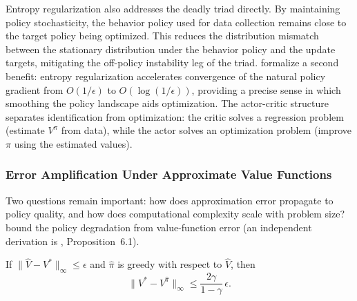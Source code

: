 Entropy regularization also addresses the deadly triad directly. By maintaining policy stochasticity, the behavior policy used for data collection remains close to the target policy being optimized. This reduces the distribution mismatch between the stationary distribution under the behavior policy and the update targets, mitigating the off-policy instability leg of the triad. \citet{cen2022fast} formalize a second benefit: entropy regularization accelerates convergence of the natural policy gradient from $O(1/\epsilon)$ to $O(\log(1/\epsilon))$, providing a precise sense in which smoothing the policy landscape aids optimization. The actor-critic structure separates identification from optimization: the critic solves a regression problem (estimate $V^\pi$ from data), while the actor solves an optimization problem (improve $\pi$ using the estimated values).

\subsubsection{Error Amplification Under Approximate Value Functions}

Two questions remain important: how does approximation error propagate to policy quality, and how does computational complexity scale with problem size? \citet{singh1994} bound the policy degradation from value-function error (an independent derivation is \citealt{bertsekastsitsiklis1996}, Proposition~6.1).

\begin{theorem}
\label{thm:singh_yee}
If $\|\hat{V} - V^*\|_\infty \leq \epsilon$ and $\hat{\pi}$ is greedy with respect to $\hat{V}$, then
\begin{equation}
\|V^* - V^{\hat{\pi}}\|_\infty \leq \frac{2\gamma}{1-\gamma}\, \epsilon.
\label{eq:singh_yee}
\end{equation}
\end{theorem}

